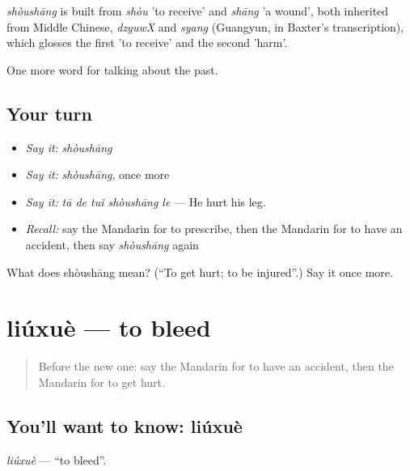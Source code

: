 \begin{cousinweb}
\emph{shòushāng} is built from \emph{shòu} 'to receive' and \emph{shāng} 'a wound', both inherited from Middle Chinese, \emph{dzyuwX} and \emph{syang} (Guangyun, in Baxter's transcription), which glosses the first 'to receive' and the second 'harm'.
\end{cousinweb}

\begin{grammarlens}[title={What you've built}]
One more word for talking about the past.
\end{grammarlens}

\subsection*{Your turn}
\begin{itemize}
\raggedright
  \item \emph{Say it:} \emph{shòushāng}
  \item \emph{Say it:} \emph{shòushāng}, once more
  \item \emph{Say it:} \emph{tā de tuǐ shòushāng le} — He hurt his leg.
  \item \emph{Recall:} say the Mandarin for to prescribe, then the Mandarin for to have an accident, then say \emph{shòushāng} again
\end{itemize}

\begin{tcolorbox}[breakable,colback=teal!4,colframe=teal!35!black,title={Before you move on}]
What does shòushāng mean? (\textquotedblleft{}To get hurt; to be injured\textquotedblright{}.) Say it once more.
\end{tcolorbox}
\section[liúxuè]{liúxuè — to bleed}

\label{lesson:ZH-C232-liuxue}



\begin{quote}
Before the new one: say the Mandarin for to have an accident, then the Mandarin for to get hurt.
\end{quote}

\subsection*{You'll want to know: liúxuè}
\emph{liúxuè} — \textquotedblleft{}to bleed\textquotedblright{}.

